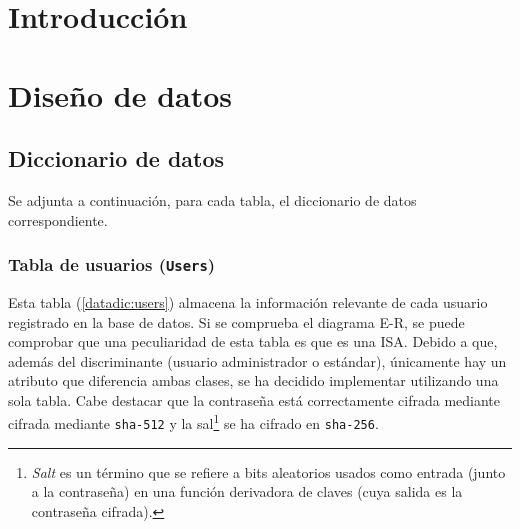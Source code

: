 
\section{Introducción}

\section{Diseño de datos}


\subsection{Diccionario de datos}

Se adjunta a continuación, para cada tabla, el diccionario de datos correspondiente.

\subsubsection{Tabla de usuarios (\texttt{Users})}
Esta tabla (\ref{datadic:users}) almacena la información relevante de cada usuario registrado en la base de datos. Si se comprueba el diagrama E-R, se puede comprobar que una peculiaridad de esta tabla es que es una ISA. Debido a que, además del discriminante (usuario administrador o estándar), únicamente hay un atributo que diferencia ambas clases, se ha decidido implementar utilizando una sola tabla. Cabe destacar que la contraseña está correctamente cifrada mediante  cifrada mediante \texttt{sha-512} y la sal\footnote{\textit{Salt} es un término que se refiere a bits aleatorios usados como entrada (junto a la contraseña) en una función derivadora de claves (cuya salida es la contraseña cifrada).} se ha cifrado en \texttt{sha-256}.

